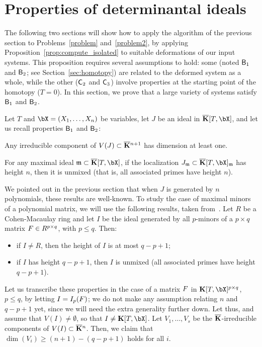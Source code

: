 \documentclass[12pt]{article}
\begin{document}

\section{Properties of determinantal ideals}\label{sec:check}

The following two sections will show how to apply the algorithm of the
previous section to Problems~\ref{problem} and~\ref{problem2}, by
applying Proposition~\ref{prop:compute_isolated} to suitable
deformations of our input systems. This proposition requires several
assumptions to hold: some (noted $\mathsf{B}_1$ and $\mathsf{B}_2$; see
Section~\ref{sec:homotopy}) are related to the deformed system as a
whole, while the other ($\mathsf{C}_2$ and $\mathsf{C}_3$) involve properties at
the starting point of the homotopy ($T=0$). In this section, we prove
that a large variety of systems satisfy $\mathsf{B}_1$ and $\mathsf{B}_2$.

Let $T$ and $\bX=(X_1,\dots,X_n)$ be variables, let $J$ be an ideal in
$\KKbar[T,\bX]$, and let us recall properties $\mathsf{B}_1$ and $\mathsf{B}_2$: 
\begin{description}[leftmargin=*]
\item[$\assA_1.$] Any irreducible component of $V(J) \subset
  \overline{\mathbf{K}}{}^{n+1}$ has dimension at least one.
\item[$\assA_2.$] For any maximal ideal $\m \subset\KKbar[T,\bX]$,
  if the localization $J_\m \subset \KKbar[T,\bX]_\m$ has height $n$,
  then it is unmixed (that is, all associated primes have height $n$).
\end{description}

We pointed out in the previous section that when $J$ is generated by
$n$ polynomials, these results are well-known. To study the case of
maximal minors of a polynomial matrix, we will use the following
results, taken from~\cite[Section~6]{EN62}. Let $R$ be a
Cohen-Macaulay ring and let $I$ be the ideal generated by all $p$-minors
of a $p\times q$ matrix ${F} \in R^{p\times q}$, with $p \le q$. Then:
\begin{itemize}
\item if $I \ne R$, then the height of $I$ is at most $q-p+1$;
\item if $I$ has height $q-p+1$, then $I$ is unmixed (all associated
  primes have height $q-p+1$).
\end{itemize}
Let us transcribe these properties in the case of a matrix ${F}$ in
$\KK[T,\bX]^{p \times q}$, $p \le q$, by letting $I=I_p({F})$; we do not make any
assumption relating $n$ and $q-p+1$ yet, since we will need the extra
generality further down. Let thus, and assume that $V(I)\ne
\emptyset$, so that $I \ne \KK[T,\bX]$. Let $V_1,\dots,V_s$ be the
$\overline{\mathbf{K}}$-irreducible components of $V(I)\subset \overline{\mathbf{K}}{}^n$.  Then, we
claim that $\dim(V_i) \ge (n+1) -(q-p+1)$ holds for all $i$.
\end{document}
